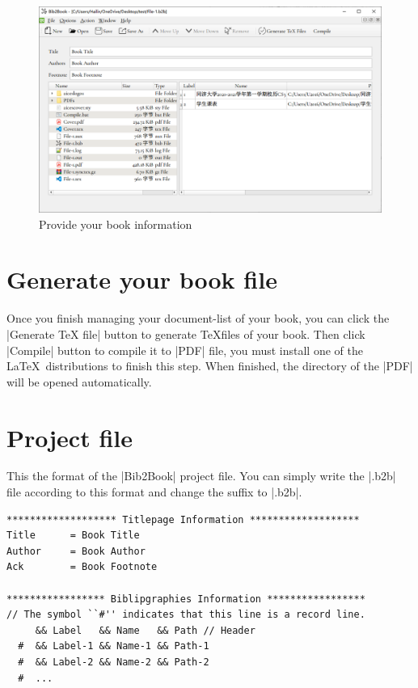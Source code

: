 \documentclass{article}
\begin{document}
    \begin{figure}[htb]
        \centering
        \includegraphics[width=\textwidth]{figures/project.png}
        \caption{Provide your book information}
        \label{fig:information}
    \end{figure}

    \section{Generate your book file}

    Once you finish managing your document-list of your book, you can click the |Generate TeX file| button to generate \TeX files of your book. Then click |Compile| button to compile it to |PDF| file, you must install one of the \LaTeX\ distributions to finish this step. When finished, the directory of the |PDF| will be opened automatically.

    \section{Project file}

    This the format of the |Bib2Book| project file. You can simply write the |.b2b| file according to this format and change the suffix to |.b2b|.

\begin{lstlisting}[language=b2b, columns=fixed]
******************* Titlepage Information *******************
Title      = Book Title
Author     = Book Author
Ack        = Book Footnote

***************** Biblipgraphies Information *****************
// The symbol ``#'' indicates that this line is a record line.
     && Label   && Name   && Path // Header
  #  && Label-1 && Name-1 && Path-1 
  #  && Label-2 && Name-2 && Path-2
  #  ...
\end{lstlisting}
\end{document}
